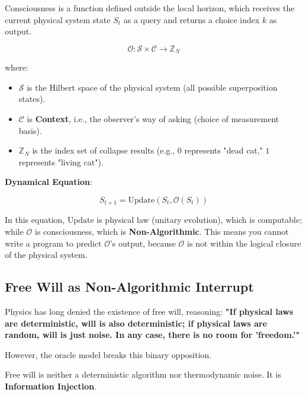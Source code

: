 \begin{definition}
Consciousness is a function defined outside the local horizon, which receives the current physical system state $S_t$ as a query and returns a choice index $k$ as output.

\begin{equation}
\mathcal{O}: \mathcal{S} \times \mathcal{C} \to \mathbb{Z}_N
\end{equation}

where:

\begin{itemize}
\item $\mathcal{S}$ is the Hilbert space of the physical system (all possible superposition states).

\item $\mathcal{C}$ is \textbf{Context}, i.e., the observer's way of asking (choice of measurement basis).

\item $\mathbb{Z}_N$ is the index set of collapse results (e.g., $0$ represents "dead cat," $1$ represents "living cat").
\end{itemize}

\textbf{Dynamical Equation}:

\begin{equation}
S_{t+1} = \text{Update}(S_t, \mathcal{O}(S_t))
\end{equation}
\end{definition}

In this equation, $\text{Update}$ is physical law (unitary evolution), which is computable; while $\mathcal{O}$ is consciousness, which is \textbf{Non-Algorithmic}. This means you cannot write a program to predict $\mathcal{O}$'s output, because $\mathcal{O}$ is not within the logical closure of the physical system.

\subsection{Free Will as Non-Algorithmic Interrupt}

Physics has long denied the existence of free will, reasoning: \textbf{"If physical laws are deterministic, will is also deterministic; if physical laws are random, will is just noise. In any case, there is no room for 'freedom.'"}

However, the oracle model breaks this binary opposition.

Free will is neither a deterministic algorithm nor thermodynamic noise. It is \textbf{Information Injection}.

